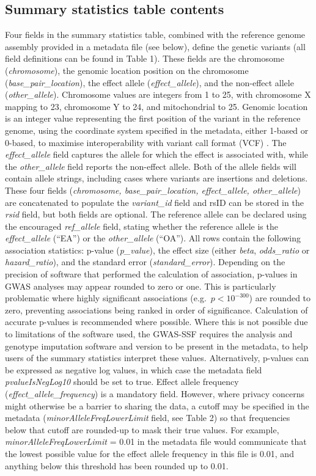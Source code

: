 \documentclass[11pt]{article}
\begin{document}
\subsection{Summary statistics table contents}
Four fields in the summary statistics table, combined with the reference genome assembly provided in a metadata file (see below), define the genetic variants (all field definitions can be found in Table 1). These fields are the chromosome (\textit{chromosome}), the genomic location position on the chromosome (\textit{base\_pair\_location}), the effect allele (\textit{effect\_allele}), and the non-effect allele (\textit{other\_allele}). Chromosome values are integers from 1 to 25, with chromosome X mapping to 23, chromosome Y to 24, and mitochondrial to 25. Genomic location is an integer value representing the first position of the variant in the reference genome, using the coordinate system specified in the metadata, either 1-based or 0-based, to maximise interoperability with variant call format (VCF) \cite{Danecek:2011ut}. The \textit{effect\_allele} field captures the allele for which the effect is associated with, while the \textit{other\_allele} field reports the non-effect allele. Both of the allele fields will contain allele strings, including cases where variants are insertions and deletions. These four fields (\textit{chromosome, base\_pair\_location, effect\_allele, other\_allele}) are concatenated to populate the \textit{variant\_id} field and rsID can be stored in the \textit{rsid} field, but both fields are optional. The reference allele can be declared using the encouraged \textit{ref\_allele} field, stating whether the reference allele is the \textit{effect\_allele} (``EA'') or the \textit{other\_allele} (``OA'').
All rows contain the following association statistics: p-value (\textit{p\_value}), the effect size (either \textit{beta}, \textit{odds\_ratio} or \textit{hazard\_ratio}), and the standard error (\textit{standard\_error}). Depending on the precision of software that performed the calculation of association, p-values in GWAS analyses may appear rounded to zero or one. This is particularly problematic where highly significant associations (e.g.\ $p < 10^{-300}$) are rounded to zero, preventing associations being ranked in order of significance. Calculation of accurate p-values is recommended where possible. Where this is not possible due to limitations of the software used, the GWAS-SSF requires the analysis and genotype imputation software and version to be present in the metadata, to help users of the summary statistics interpret these values. Alternatively, p-values can be expressed as negative log values, in which case the metadata field \textit{pvalueIsNegLog10} should be set to true. Effect allele frequency (\textit{effect\_allele\_frequency}) is a mandatory field. However, where privacy concerns might otherwise be a barrier to sharing the data, a cutoff may be specified in the metadata (\textit{minorAlleleFreqLowerLimit} field, see Table 2) so that frequencies below that cutoff are rounded-up to mask their true values. For example, \textit{minorAlleleFreqLowerLimit} = 0.01 in the metadata file would communicate that the lowest possible value for the effect allele frequency in this file is 0.01, and anything below this threshold has been rounded up to 0.01.
\end{document}
